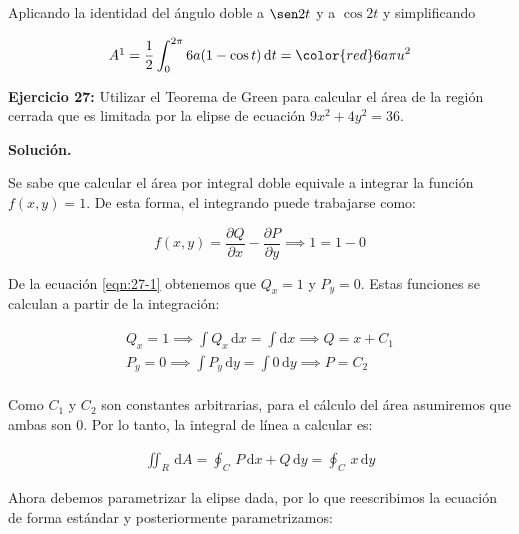 \documentclass[12pt]{article}
\DeclareMathOperator{\di}{d\!}
\begin{document}
Aplicando la identidad del ángulo doble a $\sen 2t$ y a $\cos 2t$ y simplificando

\begin{align*}
	 A \footnotemark = \frac{1}{2} \int_0^{2\pi} 6a(1-\cos t) \di t = \color{red} 6a\pi u^2 
\end{align*} 



\noindent \textbf{Ejercicio 27:} Utilizar el Teorema de Green para calcular el área de la región cerrada que es limitada por la elipse de ecuación $9x^2 + 4y^2 = 36$.

\vspace{5mm}

\noindent \textbf{Solución.}

\vspace{3mm}

\noindent Se sabe que calcular el área por integral doble equivale a integrar la función $f(x, y) = 1$. De esta forma, el integrando puede trabajarse como:

\begin{equation}\label{eqn:27-1}\tag{1}
	f(x, y) = \frac{\partial Q}{\partial x} - \frac{\partial P}{\partial y} \implies 1 = 1 - 0
\end{equation}

\noindent De la ecuación \eqref{eqn:27-1} obtenemos que $Q_x = 1$ y $P_y = 0$. Estas funciones se calculan a partir de la integración:

\begin{align*}
	Q_x = 1 \implies \int Q_x\, \mathrm{d}x = \int \mathrm{d}x \implies Q = x + C_1 \\
	P_y = 0 \implies \int P_y\, \mathrm{d}y = \int 0\, \mathrm{d}y \implies P = C_2 \\
\end{align*}

\noindent Como $C_1$ y $C_2$ son constantes arbitrarias, para el cálculo del área asumiremos que ambas son 0. Por lo tanto, la integral de línea a calcular es:

\begin{align*}
	\iint_R\,\mathrm{d}A = \oint_C\, P\,\mathrm{d}x + Q\,\mathrm{d}y = \oint_C\, x\, \mathrm{d}y
\end{align*}

\noindent Ahora debemos parametrizar la elipse dada, por lo que reescribimos la ecuación de forma estándar y posteriormente parametrizamos:
\end{document}
